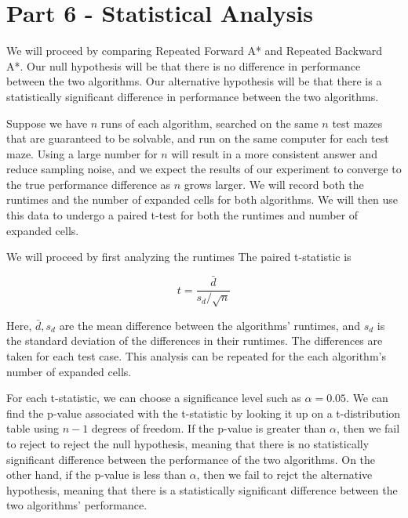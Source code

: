 \documentclass[12pt]{article}
\begin{document}
\section{Part 6 - Statistical Analysis}

We will proceed by comparing Repeated Forward A* and Repeated Backward A*.
Our null hypothesis will be that there is no difference in performance between the two algorithms.
Our alternative hypothesis will be that there is a statistically significant difference in performance between the two algorithms.

Suppose we have $n$ runs of each algorithm,
searched on the same $n$ test mazes that are guaranteed to be solvable,
and run on the same computer for each test maze.
Using a large number for $n$ will result in a more consistent answer and reduce sampling noise,
and we expect the results of our experiment to converge to the true performance difference as $n$ grows larger.
We will record both the runtimes and the number of expanded cells for both algorithms.
We will then use this data to undergo a paired t-test for both the runtimes and number of expanded cells.

We will proceed by first analyzing the runtimes
The paired t-statistic is

$$
t = \frac{\bar{d}}{s_d/\sqrt{n}}
$$

Here, 
$\bar{d}, s_d$ are the mean difference between the algorithms' runtimes, 
and $s_d$ is the standard deviation of the differences in their runtimes.
The differences are taken for each test case.
This analysis can be repeated for the each algorithm's number of expanded cells.

For each t-statistic,
we can choose a significance level such as 
$\alpha = 0.05$.
We can find the p-value associated with the t-statistic by looking it up on a t-distribution table using 
$n-1$ degrees of freedom.
If the p-value is greater than $\alpha$,
then we fail to reject to reject the null hypothesis,
meaning that there is no statistically significant difference between the performance of the two algorithms.
On the other hand,
if the p-value is less than $\alpha$,
then we fail to rejct the alternative hypothesis,
meaning that there is a statistically significant difference between the two algorithms' performance.
\end{document}
